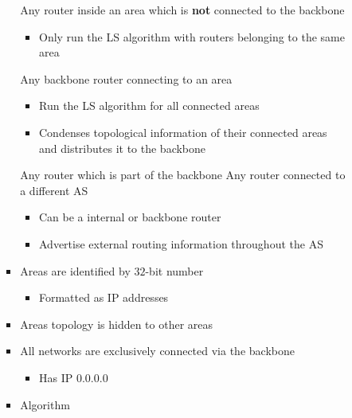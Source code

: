 \begin{itemize}
\begin{itemize}
\begin{itemize}
\begin{itemize}
\begin{itemize}
                            \end{itemize}
                         Any router inside an area which is \textbf{not} connected to the backbone
                            \begin{itemize}
                                \item Only run the LS algorithm with routers belonging to the same area
                            \end{itemize}
                         Any backbone router connecting to an area
                            \begin{itemize}
                                \item Run the LS algorithm for all connected areas
                                \item Condenses topological information of their connected areas and distributes it to the backbone
                            \end{itemize}
                         Any router which is part of the backbone
                         Any router connected to a different AS
                            \begin{itemize}
                                \item Can be a internal or backbone router
                                \item Advertise external routing information throughout the AS
                            \end{itemize}
                        \item Areas are identified by $32$-bit number
                            \begin{itemize}
                                \item Formatted as IP addresses
                            \end{itemize}
                        \item Areas topology is hidden to other areas
                        \item All networks are exclusively connected via the backbone
                            \begin{itemize}
                                \item Has IP $0.0.0.0$
                            \end{itemize}
                        \item Algorithm

\end{itemize}
\end{itemize}
\end{itemize}
\end{itemize}
